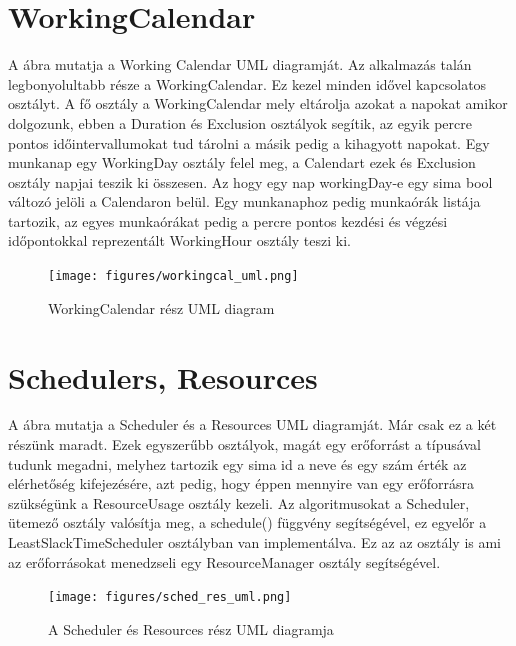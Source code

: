\section{WorkingCalendar}
\hspace{2mm} A  ábra mutatja a Working Calendar UML diagramját. Az alkalmazás talán legbonyolultabb része a WorkingCalendar. Ez kezel minden idővel kapcsolatos osztályt. A fő osztály a WorkingCalendar mely eltárolja azokat a napokat amikor dolgozunk, ebben a Duration és Exclusion osztályok segítik, az egyik percre pontos időintervallumokat tud tárolni a másik pedig a kihagyott napokat. Egy munkanap egy WorkingDay osztály felel meg, a Calendart ezek és Exclusion osztály napjai teszik ki összesen. Az hogy egy nap workingDay-e egy sima bool változó jelöli a Calendaron belül. Egy munkanaphoz pedig munkaórák listája tartozik, az egyes munkaórákat pedig a percre pontos kezdési és végzési időpontokkal reprezentált WorkingHour osztály teszi ki.
\begin{figure}[!ht]
\centering
\texttt{[image: figures/workingcal\_uml.png]}
\caption{WorkingCalendar rész UML diagram} 
\label{fig:workingcal_uml}
\end{figure} 

\section{Schedulers, Resources}
\hspace{2mm} A  ábra mutatja a Scheduler és a Resources UML diagramját. Már csak ez a két részünk maradt. Ezek egyszerűbb osztályok, magát egy erőforrást a típusával tudunk megadni, melyhez tartozik egy sima id a neve és egy szám érték az elérhetőség kifejezésére, azt pedig, hogy éppen mennyire van egy erőforrásra szükségünk a ResourceUsage osztály kezeli.
\hspace{2mm} Az algoritmusokat a Scheduler, ütemező osztály valósítja meg, a schedule() függvény segítségével, ez egyelőr a LeastSlackTimeScheduler osztályban van implementálva. Ez az az osztály is ami az erőforrásokat menedzseli egy ResourceManager osztály segítségével. 
\begin{figure}[!ht]
\centering
\texttt{[image: figures/sched\_res\_uml.png]}
\caption{A Scheduler és Resources rész UML diagramja} 
\label{fig:sched_res_uml}
\end{figure} 